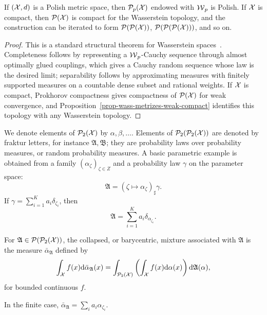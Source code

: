 \begin{prop}\label{prop-wasserstein-space-polish}
	If $(\mathcal{X},d)$ is a Polish metric space, then $\mathcal{P}_p(\mathcal{X})$ endowed with $\operatorname{\mathcal{W}}_p$ is Polish. If $\mathcal{X}$ is compact, then $\mathcal{P}(\mathcal{X})$ is compact for the Wasserstein topology, and the construction can be iterated to form $\mathcal{P}(\mathcal{P}(\mathcal{X}))$, $\mathcal{P}(\mathcal{P}(\mathcal{P}(\mathcal{X})))$, and so on.
\end{prop}
\begin{proof}
	This is a standard structural theorem for Wasserstein spaces~\cite{Villani09,SantambrogioBook,ambrosio2006gradient}. Completeness follows by representing a $\operatorname{\mathcal{W}}_p$-Cauchy sequence through almost optimally glued couplings, which gives a Cauchy random sequence whose law is the desired limit; separability follows by approximating measures with finitely supported measures on a countable dense subset and rational weights. If $\mathcal{X}$ is compact, Prokhorov compactness gives compactness of $\mathcal{P}(\mathcal{X})$ for weak convergence, and Proposition~\ref{prop-wass-metrizes-weak-compact} identifies this topology with any Wasserstein topology.
\end{proof}

We denote elements of $\mathcal{P}_2(\mathcal{X})$ by $\alpha,\beta,\ldots$. Elements of
$\mathcal{P}_2(\mathcal{P}_2(\mathcal{X}))$ are denoted by fraktur letters, for instance
$\mathfrak A,\mathfrak B$; they are probability laws over probability measures, or random probability measures. A basic parametric example is obtained from a family $(\alpha_\zeta)_{\zeta\in Z}$ and a probability law $\gamma$ on the parameter space:
\begin{equation}\label{eq-wow-parametric-law}
	\mathfrak A=(\zeta\mapsto\alpha_\zeta)_\sharp\gamma.
\end{equation}
If $\gamma=\sum_{i=1}^K a_i\delta_{\zeta_i}$, then
\[
	\mathfrak A=\sum_{i=1}^K a_i\delta_{\alpha_{\zeta_i}}.
\]
\begin{defn}\label{def-collapsed-barycentric-mixture}
	For $\mathfrak A\in\mathcal{P}(\mathcal{P}_2(\mathcal{X}))$, the collapsed, or barycentric, mixture associated with $\mathfrak A$ is the measure $\bar\alpha_{\mathfrak A}$ defined by
	\begin{equation}\label{eq-wow-barycentric-mixture}
		\int_{\mathcal{X}} f(x)\mathrm{d}\bar\alpha_{\mathfrak A}(x)
		=
		\int_{\mathcal{P}_2(\mathcal{X})}
		\left(\int_{\mathcal{X}} f(x)\mathrm{d}\alpha(x)\right)
		\mathrm{d}\mathfrak A(\alpha),
	\end{equation}
	for bounded continuous $f$.
\end{defn}
In the finite case, $\bar\alpha_{\mathfrak A}=\sum_i a_i\alpha_{\zeta_i}$.

